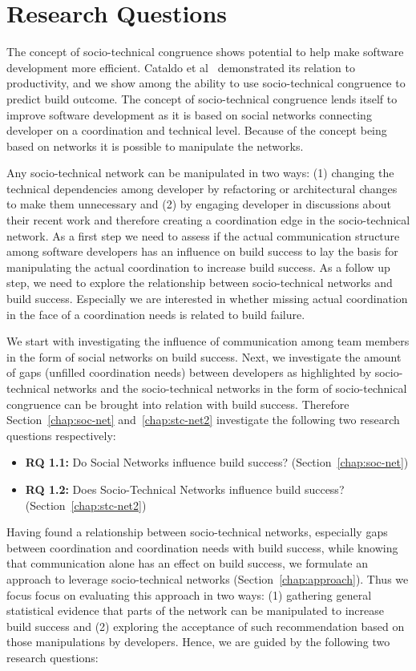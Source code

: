 \section{Research Questions}
The concept of socio-technical congruence shows potential to help make software development more efficient.
Cataldo et al~\cite{cataldo:cscw:2006} demonstrated its relation to productivity, and we show among the ability to use socio-technical congruence to predict build outcome.
The concept of socio-technical congruence lends itself to improve software development as it is based on social networks connecting developer on a coordination and technical level.
Because of the concept being based on networks it is possible to manipulate the networks.

Any socio-technical network can be manipulated in two ways: (1) changing the technical dependencies among developer by refactoring or architectural changes to make them unnecessary and (2) by engaging developer in discussions about their recent work and therefore creating a coordination edge in the socio-technical network.
As a first step we need to assess if the actual communication structure among software developers has an influence on build success to lay the basis for manipulating the actual coordination to increase build success.
As a follow up step, we need to explore the relationship between socio-technical networks and build success.
Especially we are interested in whether missing actual coordination in the face of a coordination needs is related to build failure.

We start with investigating the influence of communication among team members in the form of social networks on build success.
Next, we investigate the amount of gaps (unfilled coordination needs) between developers as highlighted by socio-technical networks and the socio-technical networks in the form of socio-technical congruence can be brought into relation with build success.
Therefore Section~\ref{chap:soc-net} and~\ref{chap:stc-net2} investigate the following two research questions respectively:

\begin{itemize}
  \item\textbf{RQ 1.1:} Do Social Networks influence build success? (Section~\ref{chap:soc-net})
  \item\textbf{RQ 1.2:} Does Socio-Technical Networks influence build success? (Section~\ref{chap:stc-net2})
\end{itemize}

Having found a relationship between socio-technical networks, especially gaps between coordination and coordination needs with build success, while knowing that communication alone has an effect on build success, we formulate an approach to leverage socio-technical networks (Section~\ref{chap:approach}).
Thus we focus focus on evaluating this approach in two ways:
(1) gathering general statistical evidence that parts of the network can be manipulated to increase build success and
(2) exploring the acceptance of such recommendation based on those manipulations by developers.
Hence, we are guided by the following two research questions:

